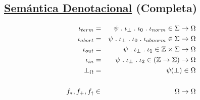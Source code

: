   \subsection*{\underline{Semántica Denotacional} (Completa)}
    \begin{eqnarray*}
      \iota_{term} &=& \psi \; . \; \iota_{\bot} \; . \; \iota_0 \; . \; \iota_{norm} \in \Sigma \rightarrow \Omega \\
      \iota_{abort} &=& \psi \; . \; \iota_{\bot} \; . \; \iota_0 \; . \; \iota_{abnorm} \in \Sigma \rightarrow \Omega \\
      \iota_{out} &=& \psi \; . \; \iota_{\bot} \; . \; \iota_1 \in \mathbb{Z} \times \Sigma \rightarrow \Omega \\
      \iota_{in} &=& \psi \; . \; \iota_{\bot} \; . \; \iota_2 \in (\mathbb{Z} \rightarrow \Sigma) \rightarrow \Omega \\
      \bot_{\Omega} &=& \psi(\bot) \in \Omega \\ \\
      f_{\ast}, f_{+}, f_{\dag} &\in& \Omega \rightarrow \Omega \\
    \end{eqnarray*}
